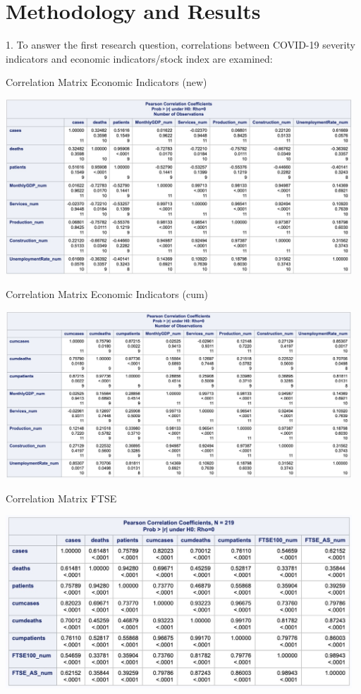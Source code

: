 \documentclass[12pt, a4paper]{report}
\begin{document}
\section{Methodology and Results}
1. To answer the first research question, correlations between COVID-19 severity indicators
and economic indicators/stock index are examined:

\begin{table}[H]
\centering
\caption{Correlation Matrix Economic Indicators (new)}
\includegraphics[width=13cm]{corr_economics_new.jpg}
\end{table}

\begin{table}[H]
\centering
\caption{Correlation Matrix Economic Indicators (cum)}
\includegraphics[width=13cm]{corr_economics_cum.jpg}
\end{table}

\begin{table}[H]
\centering
\caption{Correlation Matrix FTSE}
\includegraphics[width=13cm]{corr_stock.jpg}
\end{table}
\hspace*{\fill}
\end{document}

